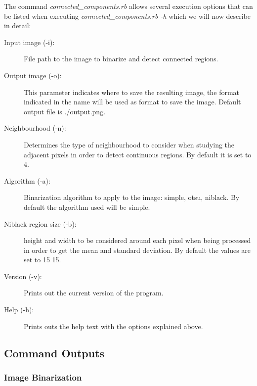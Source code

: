 \documentclass[a4paper,10pt,titlepage]{article}
\begin{document}
\par The command \textit{connected\_components.rb} allows several execution options that can be listed when executing  \textit{connected\_components.rb -h} which we will now describe in detail:
\begin{description}
	\item[Input image (-i):] File path to the image to binarize and detect connected regions. 
	\item[Output image (-o):] This parameter indicates where to save the resulting image, the format indicated in the name will be used as format to save the image. Default output file is ./output.png.
	\item[Neighbourhood (-n):] Determines the type of neighbourhood to consider when studying the adjacent pixels in order to detect continuous regions. By default it is set to 4.  
	\item[Algorithm (-a):] Binarization algorithm to apply to the image: simple, otsu, niblack. By default the algorithm used will be simple. 
	\item[Niblack region size (-b):] height and width to be considered around each pixel when being processed in order to get the mean and standard deviation. By default the values are set to 15 15.
	\item[Version (-v):] Prints out the current version of the program.
	\item[Help (-h):] Prints outs the help text with the options explained above.

\end{description}

\subsection{Command Outputs}

\subsubsection{Image Binarization}
\end{document}
